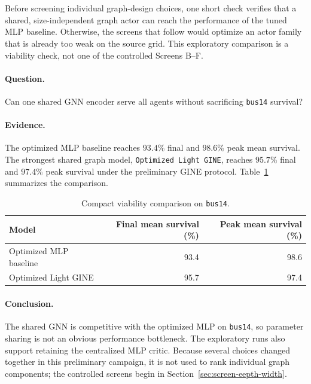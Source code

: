\section{\texorpdfstring{}{Shared GNN Viability Check}}
\label{subsec:gnn-viability}

{\color{red}
Before screening individual graph-design choices, one short check verifies that
a shared, size-independent graph actor can reach the performance of the tuned
MLP baseline. Otherwise, the screens that follow would optimize an actor family
that is already too weak on the source grid. This exploratory comparison is a
viability check, not one of the controlled Screens B--F.

\paragraph{Question.}
Can one shared GNN encoder serve all agents without sacrificing
\texttt{bus14} survival?

\paragraph{Evidence.}
The optimized MLP baseline reaches $93.4\%$ final and $98.6\%$ peak mean
survival. The strongest shared graph model, \texttt{Optimized Light GINE},
reaches $95.7\%$ final and $97.4\%$ peak survival under the preliminary GINE
protocol. Table~\ref{tab:gnn-viability-compact} summarizes the comparison.

\begin{table}[H]
  \color{red}
  \centering
  \small
  \caption{Compact viability comparison on \texttt{bus14}.}
  \label{tab:gnn-viability-compact}
  \begin{tabular}{lrr}
    \toprule
    Model & Final mean survival (\%) & Peak mean survival (\%) \\
    \midrule
    Optimized MLP baseline & 93.4 & 98.6 \\
    Optimized Light GINE & 95.7 & 97.4 \\
    \bottomrule
  \end{tabular}
\end{table}

\paragraph{Conclusion.}
The shared GNN is competitive with the optimized MLP on \texttt{bus14}, so
parameter sharing is not an obvious performance bottleneck. The exploratory
runs also support retaining the centralized MLP critic. Because several
choices changed together in this preliminary campaign, it is not used to rank
individual graph components; the controlled screens begin in
Section~\ref{sec:screen-eepth-width}.
}
